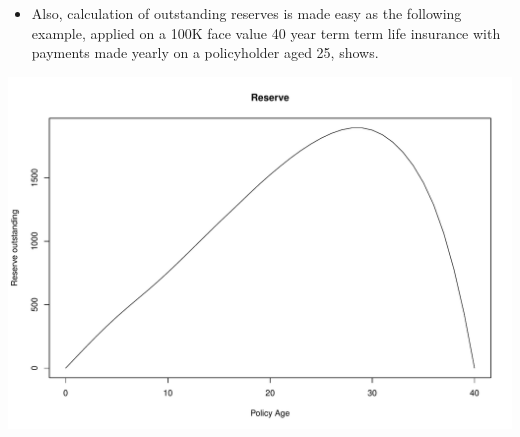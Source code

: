 \begin{frame}[fragile]

\begin{itemize}[<+->]
\itemsep1pt\parskip0pt
\item
  Also, calculation of outstanding reserves is made easy as the
  following example, applied on a 100K face value 40 year term term life
  insurance with payments made yearly on a policyholder aged 25, shows.
\end{itemize}

\begin{Shaded}
\begin{Highlighting}[]
\NormalTok{*}\NormalTok{(} \NormalTok{,}\NormalTok{) }
\NormalTok{(} \NormalTok{,}\NormalTok{)}
  \NormalTok{*}\NormalTok{(} \StringTok{ }
\StringTok{  }\NormalTok{(} 
\NormalTok{(}\NormalTok{:}
\end{Highlighting}
\end{Shaded}

\end{frame}

\begin{frame}

\begin{center}\includegraphics{introToLifecontingencies_files/figure-beamer/reserves2-1} \end{center}

\end{frame}

